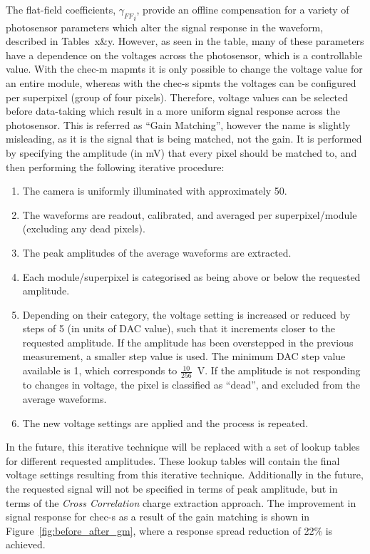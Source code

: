 The flat-field coefficients, ${\gamma_{FF}}_i$, provide an offline compensation for a variety of photosensor parameters which alter the signal response in the waveform, described in Tables~x\&y. However, as seen in the table, many of these parameters have a dependence on the voltages across the photosensor, which is a controllable value. With the \gls{chec-m} \glspl{mapmt} it is only possible to change the voltage value for an entire module, whereas with the \gls{chec-s} \glspl{sipmt} the voltages can be configured per superpixel (group of four pixels). Therefore, voltage values can be selected before data-taking which result in a more uniform signal response across the photosensor. This is referred as ``Gain Matching'', however the name is slightly misleading, as it is the signal that is being matched, not the gain. It is performed by specifying the amplitude (in \si{mV}) that every pixel should be matched to, and then performing the following iterative procedure:
\begin{enumerate}
	\item The camera is uniformly illuminated with approximately \SI{50}{\pe}.
	\item The waveforms are readout, calibrated, and averaged per superpixel/module (excluding any dead pixels).
    \item The peak amplitudes of the average waveforms are extracted.
    \item Each module/superpixel is categorised as being above or below the requested amplitude.
    \item Depending on their category, the voltage setting is increased or reduced by steps of 5 (in units of DAC value), such that it increments closer to the requested amplitude. If the amplitude has been overstepped in the previous measurement, a smaller step value is used. The minimum DAC step value available is 1, which corresponds to $\frac{10}{256}$~V. If the amplitude is not responding to changes in voltage, the pixel is classified as ``dead'', and excluded from the average waveforms.
    \item The new voltage settings are applied and the process is repeated.
\end{enumerate}

In the future, this iterative technique will be replaced with a set of lookup tables for different requested amplitudes. These lookup tables will contain the final voltage settings resulting from this iterative technique. Additionally in the future, the requested signal will not be specified in terms of peak amplitude, but in terms of the \textit{Cross Correlation} charge extraction approach. The improvement in signal response for \gls{chec-s} as a result of the gain matching is shown in Figure~\ref{fig:before_after_gm}, where a response spread reduction of 22\% is achieved.

